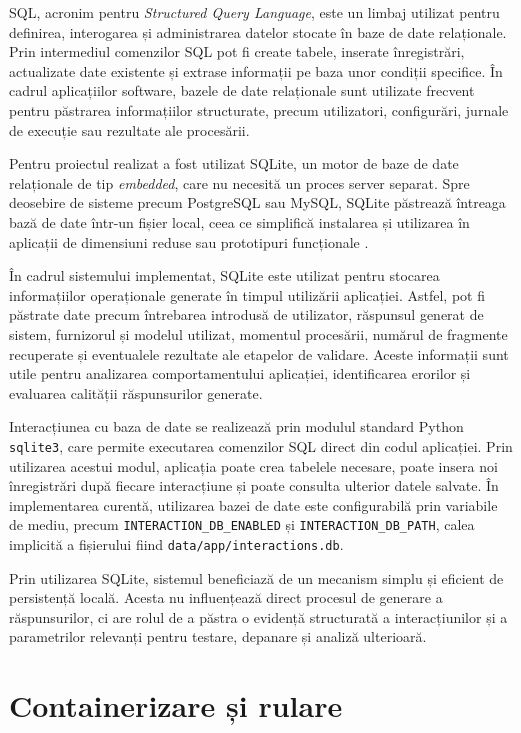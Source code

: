 \documentclass[12pt, a4paper, oneside, romanian]{teza-upb}
\begin{document}
SQL, acronim pentru \textit{Structured Query Language}, este un limbaj utilizat pentru definirea, interogarea și administrarea datelor stocate în baze de date relaționale. Prin intermediul comenzilor SQL pot fi create tabele, inserate înregistrări, actualizate date existente și extrase informații pe baza unor condiții specifice. În cadrul aplicațiilor software, bazele de date relaționale sunt utilizate frecvent pentru păstrarea informațiilor structurate, precum utilizatori, configurări, jurnale de execuție sau rezultate ale procesării.

Pentru proiectul realizat a fost utilizat SQLite, un motor de baze de date relaționale de tip \textit{embedded}, care nu necesită un proces server separat. Spre deosebire de sisteme precum PostgreSQL sau MySQL, SQLite păstrează întreaga bază de date într-un fișier local, ceea ce simplifică instalarea și utilizarea în aplicații de dimensiuni reduse sau prototipuri funcționale \cite{sqlite_doc}. 

În cadrul sistemului implementat, SQLite este utilizat pentru stocarea informațiilor operaționale generate în timpul utilizării aplicației. Astfel, pot fi păstrate date precum întrebarea introdusă de utilizator, răspunsul generat de sistem, furnizorul și modelul utilizat, momentul procesării, numărul de fragmente recuperate și eventualele rezultate ale etapelor de validare. Aceste informații sunt utile pentru analizarea comportamentului aplicației, identificarea erorilor și evaluarea calității răspunsurilor generate.

Interacțiunea cu baza de date se realizează prin modulul standard Python \texttt{sqlite3}, care permite executarea comenzilor SQL direct din codul aplicației. Prin utilizarea acestui modul, aplicația poate crea tabelele necesare, poate insera noi înregistrări după fiecare interacțiune și poate consulta ulterior datele salvate. În implementarea curentă, utilizarea bazei de date este configurabilă prin variabile de mediu, precum \texttt{INTERACTION\_DB\_ENABLED} și \texttt{INTERACTION\_DB\_PATH}, calea implicită a fișierului fiind \texttt{data/app/interactions.db}.

Prin utilizarea SQLite, sistemul beneficiază de un mecanism simplu și eficient de persistență locală. Acesta nu influențează direct procesul de generare a răspunsurilor, ci are rolul de a păstra o evidență structurată a interacțiunilor și a parametrilor relevanți pentru testare, depanare și analiză ulterioară.


\section{Containerizare și rulare}
\end{document}
